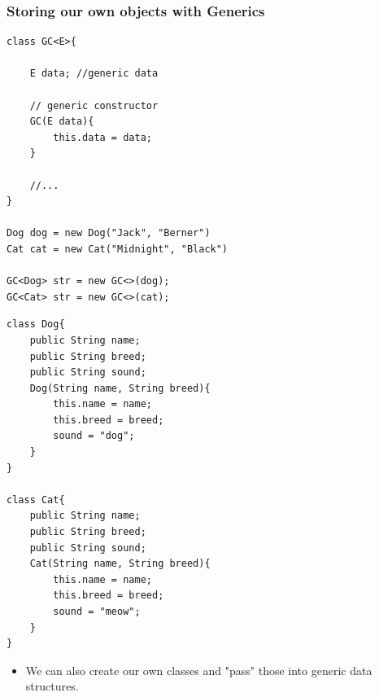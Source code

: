 \documentclass{beamer}
\begin{document}
\begin{frame}[fragile]
    \frametitle{Storing our own objects with Generics}
    \begin{minipage}{0.49\textwidth}
        \begin{lstlisting}[basicstyle=\tiny]
class GC<E>{

    E data; //generic data
    
    // generic constructor
    GC(E data){
        this.data = data;
    }

    //...
}

Dog dog = new Dog("Jack", "Berner")
Cat cat = new Cat("Midnight", "Black")

GC<Dog> str = new GC<>(dog);
GC<Cat> str = new GC<>(cat);
        \end{lstlisting}
    \end{minipage}
    \begin{minipage}{0.49\textwidth}
        \begin{lstlisting}[basicstyle=\tiny]
class Dog{
    public String name;
    public String breed; 
    public String sound; 
    Dog(String name, String breed){
        this.name = name;
        this.breed = breed;
        sound = "dog";
    }
}

class Cat{
    public String name;
    public String breed; 
    public String sound;
    Cat(String name, String breed){
        this.name = name;
        this.breed = breed;
        sound = "meow";
    }
}

        \end{lstlisting}
    \end{minipage}
    \begin{itemize}
        \item We can also create our own classes and "pass" those into generic data structures.
    \end{itemize}
\end{frame}
\end{document}
